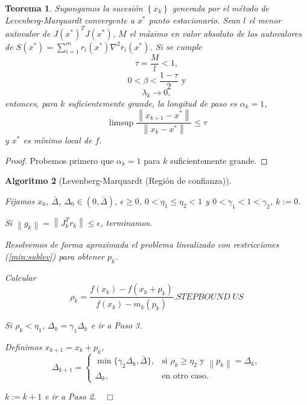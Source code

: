 \documentclass[11pt,a4paper]{book}
\newtheorem{theorem}{Teorema}[chapter]
\newtheorem{algorithm}[theorem]{Algoritmo}
\theoremstyle{definition}
\theoremstyle{remark}
\newcommand{\norm}[1]{\left\lVert#1\right\rVert}
\newcommand{\sucesionxk}{\left\{x_k\right\}}
\begin{document}
\begin{theorem}
Supongamos la sucesión $\sucesionxk$ generada por el método de Levenberg-Marquardt convergente a $x^*$ punto estacionario. Sean $l$ el menor autovalor de $J(x^*)^TJ(x^*)$, $M$ el máximo en valor absoluto de los autovalores de $S(x^*)=\sum_{i=1}^m r_i(x^*)\nabla^2r_i(x^*)$. Si se cumple
\begin{equation*}
\tau = \frac{M}{l} < 1,
\end{equation*}
\begin{equation*}
0<\beta<\frac{1-\tau}{2} \text{ y}
\end{equation*}
\begin{equation*}
\lambda_k \rightarrow 0,
\end{equation*}
entonces, para $k$ suficientemente grande, la longitud de paso es $\alpha_k=1$,
\begin{equation}
\limsup \frac{\norm{x_{k+1}-x^*}}{\norm{x_k-x^*}} \leq \tau
\end{equation}
y $x^*$ es mínimo local de $f$.
\end{theorem}
\begin{proof}
Probemos primero que $\alpha_k=1$ para $k$ suficientemente grande. 
\end{proof}

\begin{algorithm}[Levenberg-Marquardt (Región de confianza)] \leavevmode
	\label{al:tr-lm}
	\begin{steps}
		\item Fijamos $x_0$, $\bar{\Delta}$, $\Delta_0 \in (0, \bar{\Delta})$,
			$\epsilon \geq 0$, $0<\eta_1 \leq \eta_2<1$ y $0<\gamma_1<1<\gamma_2$, $k:=0$. 
		\item Si $\norm{g_k} = \norm{J_k^Tr_k} \leq \epsilon$, terminamos.
		\item Resolvemos de forma aproximada el problema linealizado
			con restricciones (\ref{min:sublev}) para obtener $p_k$.
		\item Calcular
			\begin{equation*}
				\rho_k = \frac{f(x_k)-f(x_k+p_k)}{f(x_k)-m_k(p_k)}. STEPBOUND\;US
			\end{equation*}
		\item Si $\rho_k < \eta_1$, $\Delta_{k} = \gamma_1\Delta_k$ e ir a Paso 3.
		\item Definimos $x_{k+1} = x_k + p_k$,
			\begin{equation*}
				\Delta_{k+1} = 
				\begin{cases}
					\min \{ \gamma_2\Delta_k, \bar{\Delta}\},& \text{si } \rho_k \geq \eta_2 \text{ y } \norm{p_k}=\Delta_k,\\
					\Delta_k, & \text{en otro caso.}
				\end{cases}
			\end{equation*}
		\item $k:=k+1$ e ir a Paso 2.$\quad \Box$
	\end{steps}
\end{algorithm}
\end{document}
